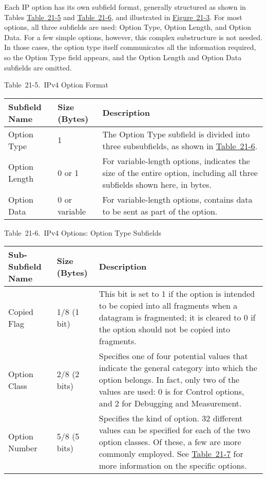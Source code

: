Each IP option has its own subfield format, generally structured as
shown in Tables
\protect\hyperlink{ch21s03.htmlux5cux23ipv_option_format}{Table~21-5}
and
\protect\hyperlink{ch21s03.htmlux5cux23ipv_options_option_type_subfields}{Table~21-6},
and illustrated in
\protect\hyperlink{ch21s03.htmlux5cux23ipv4_options_field_format_this_diagram_s}{Figure~21-3}.
For most options, all three subfields are used: Option
Type,
Option Length, and Option Data. For a few simple options, however, this
complex substructure is not needed. In those cases, the option type
itself communicates all the information required, so the Option Type
field appears, and the Option Length and Option Data subfields are
omitted.



Table~21-5.~IPv4 Option Format

\begin{longtable}[]{@{}lll@{}}
\toprule
Subfield Name & Size (Bytes) & Description\tabularnewline
\midrule
\endhead
Option Type & 1 & The Option Type subfield is divided into three
subsubfields, as shown in
\protect\hyperlink{ch21s03.htmlux5cux23ipv_options_option_type_subfields}{Table~21-6}.\tabularnewline
Option Length & 0 or 1 & For variable-length
options,
indicates the size of the entire option, including all three subfields
shown here, in bytes.\tabularnewline
Option Data & 0 or variable & For variable-length
options,
contains data to be sent as part of the option.\tabularnewline
\bottomrule
\end{longtable}



Table~21-6.~IPv4 Options: Option Type Subfields

\begin{longtable}[]{@{}lll@{}}
\toprule
Sub-Subfield Name & Size (Bytes) & Description\tabularnewline
\midrule
\endhead
Copied Flag & 1/8 (1 bit) & This bit is set to 1 if the option is
intended to be copied into all fragments when a datagram is fragmented;
it is cleared to 0 if the option should not be copied into
fragments.\tabularnewline
Option Class & 2/8 (2 bits) & Specifies one of four potential values
that indicate the general category into which the option belongs. In
fact, only two of the values are used: 0 is for Control options, and 2
for Debugging and Measurement.\tabularnewline
Option Number & 5/8 (5 bits) & Specifies the kind of option. 32
different values can be specified for each of the two option classes. Of
these, a few are more commonly employed. See
\protect\hyperlink{ch21s03.htmlux5cux23common_ipv_options}{Table~21-7}
for more information on the specific options.\tabularnewline
\bottomrule
\end{longtable}

